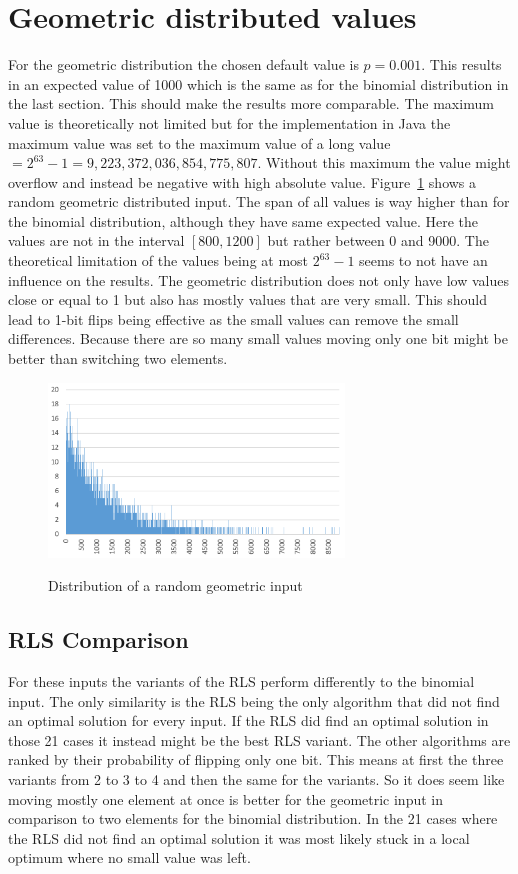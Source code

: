 \section{Geometric distributed values}
For the geometric distribution the chosen default value is $p=0.001$.
This results in an expected value of 1000 which is the same as for the binomial distribution in the last section.
This should make the results more comparable.
The maximum value is theoretically not limited but for the implementation in Java the maximum value was set to the maximum value of a long value $= 2^{63}-1 = 9,223,372,036,854,775,807$.
Without this maximum the value might overflow and instead be negative with high absolute value.
Figure~\ref{fig:geoDistExample} shows a random geometric distributed input.
The span of all values is way higher than for the binomial distribution, although they have same expected value.
Here the values are not in the interval $[800,1200]$ but rather between 0 and 9000.
The theoretical limitation of the values being at most $2^{63}-1$ seems to not have an influence on the results.
The geometric distribution does not only have low values close or equal to 1 but also has mostly values that are very small.
This should lead to 1-bit flips being effective as the small values can remove the small differences.
Because there are so many small values moving only one bit might be better than switching two elements.
\begin{figure}[h]
      \caption{Distribution of a random geometric input}
      \centering
      \includegraphics[width=0.7\textwidth]{figures/images/numberGenerator/geometricDistributionForp0_001.png}\label{fig:geoDistExample}
\end{figure}
\subsection{RLS Comparison}

For these inputs the variants of the RLS perform differently to the binomial input.
The only similarity is the RLS being the only algorithm that did not find an optimal solution for every input.
If the RLS did find an optimal solution in those 21 cases it instead might be the best RLS variant.
The other algorithms are ranked by their probability of flipping only one bit.
This means at first the three \RLSR[s] variants from 2 to 3 to 4 and then the same for the \RLSN[b] variants.
So it does seem like moving mostly one element at once is better for the geometric input in comparison to two elements for the binomial distribution.
In the 21 cases where the RLS did not find an optimal solution it was most likely stuck in a local optimum where no small value was left.

